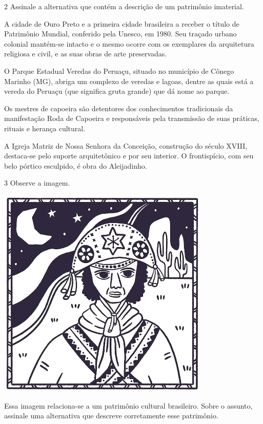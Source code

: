 \num{2}  Assinale a alternativa que contém a descrição de um patrimônio imaterial.

\begin{escolha}
\item
  A cidade de Ouro Preto e a primeira cidade brasileira a receber o
  título de Patrimônio Mundial, conferido pela Unesco, em 1980. Seu
  traçado urbano colonial mantém-se intacto e o mesmo ocorre com os
  exemplares da arquitetura religiosa e civil, e as suas obras de arte
  preservadas.
\item
  O Parque Estadual Veredas do Peruaçu, situado no município de Cônego
  Marinho (MG), abriga um complexo de veredas e lagoas, dentre as quais
  está a vereda do Peruaçu (que significa gruta grande) que dá nome ao
  parque.
\item
  Os mestres de capoeira são detentores dos conhecimentos tradicionais
  da manifestação Roda de Capoeira e responsáveis pela transmissão de
  suas práticas, rituais e herança cultural.
\item
  A Igreja Matriz de Nossa Senhora da Conceição, construção do século
  XVIII, destaca-se pelo suporte arquitetônico e por seu interior. O
  frontispício, com seu belo pórtico esculpido, é obra do Aleijadinho.
\end{escolha}



\num{3}  Observe a imagem.

\begin{minipage}{.5\textwidth}
\includegraphics[width=.6\textwidth]{./imgs/art43.png}
\end{minipage}
\begin{minipage}{.5\textwidth}
Essa imagem relaciona-se a um patrimônio cultural brasileiro. Sobre o assunto, assinale uma alternativa que descreve corretamente esse patrimônio.
\end{minipage}

